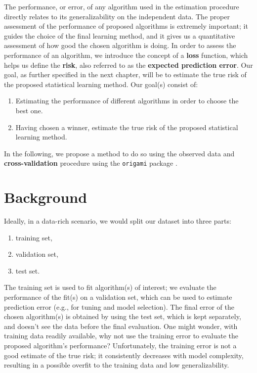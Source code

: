 \documentclass[12pt, krantz2,]{krantz}
\newcommand{\passthrough}[1]{#1}
\providecommand{\tightlist}{%
  \setlength{\itemsep}{0pt}\setlength{\parskip}{0pt}}
\theoremstyle{definition}
\theoremstyle{definition}
\theoremstyle{definition}
\newcommand{\1}{\mathbbm{1}}
\begin{document}
The performance, or error, of any algorithm used in the estimation procedure
directly relates to its generalizability on the independent data. The proper
assessment of the performance of proposed algorithms is extremely important; it
guides the choice of the final learning method, and it gives us a quantitative
assessment of how good the chosen algorithm is doing. In order to assess the
performance of an algorithm, we introduce the concept of a \textbf{loss} function,
which helps us define the \textbf{risk}, also referred to as the \textbf{expected
prediction error}. Our goal, as further specified in the next chapter, will be
to estimate the true risk of the proposed statistical learning method. Our
goal(s) consist of:

\begin{enumerate}
\def\labelenumi{\arabic{enumi}.}
\tightlist
\item
  Estimating the performance of different algorithms in order to choose the
  best one.
\item
  Having chosen a winner, estimate the true risk of the proposed
  statistical learning method.
\end{enumerate}

In the following, we propose a method to do so using the observed data and
\textbf{cross-validation} procedure using the \passthrough{\lstinline!origami!} package \citep{coyle2018origami}.

\hypertarget{background}{%
\section{Background}\label{background}}

Ideally, in a data-rich scenario, we would split our dataset into three parts:

\begin{enumerate}
\def\labelenumi{\arabic{enumi}.}
\tightlist
\item
  training set,
\item
  validation set,
\item
  test set.
\end{enumerate}

The training set is used to fit algorithm(s) of interest; we evaluate the
performance of the fit(s) on a validation set, which can be used to estimate
prediction error (e.g., for tuning and model selection). The final error of the
chosen algorithm(s) is obtained by using the test set, which is kept separately,
and doesn't see the data before the final evaluation. One might wonder, with
training data readily available, why not use the training error to evaluate the
proposed algorithm's performance? Unfortunately, the training error is not a
good estimate of the true risk; it consistently decreases with model complexity,
resulting in a possible overfit to the training data and low generalizability.
\end{document}
